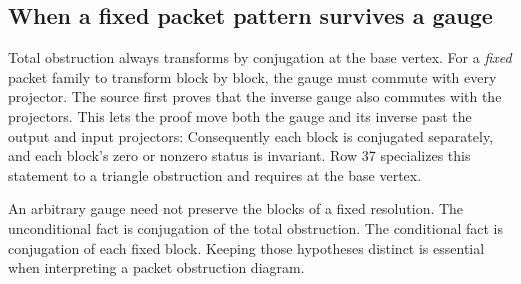 \subsection{When a fixed packet pattern survives a gauge}
Total obstruction always transforms by conjugation at the base vertex. For a \emph{fixed} packet family to transform block by block, the gauge must commute with every projector.
The source first proves that the inverse gauge also commutes with the projectors. This lets the proof move both the gauge and its inverse past the output and input projectors:
Consequently each block is conjugated separately, and each block's zero or nonzero status is invariant. Row 37 specializes this statement to a triangle obstruction and requires  at the base vertex.

An arbitrary gauge need not preserve the blocks of a fixed resolution. The unconditional fact is conjugation of the total obstruction. The conditional fact is conjugation of each fixed block. Keeping those hypotheses distinct is essential when interpreting a packet obstruction diagram.
